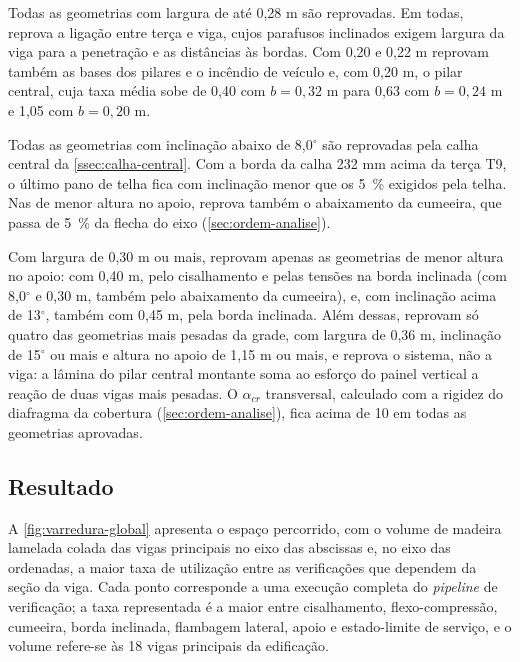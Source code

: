 \begin{alineas}
    \item Todas as geometrias com largura de até 0,28 m são reprovadas. Em todas,
          reprova a ligação entre terça e viga, cujos parafusos inclinados exigem
          largura da viga para a penetração e as distâncias às bordas. Com 0,20 e
          0,22 m reprovam também as bases dos pilares e o incêndio de veículo e,
          com 0,20 m, o pilar central, cuja taxa média sobe de 0,40 com
          $b = 0{,}32$ m para 0,63 com $b = 0{,}24$ m e 1,05 com $b = 0{,}20$ m.
    \item Todas as geometrias com inclinação abaixo de 8,0$^{\circ}$ são reprovadas
          pela calha central da \autoref{ssec:calha-central}. Com a borda da
          calha 232 mm acima da terça T9, o último pano de telha fica com
          inclinação menor que os 5~\% exigidos pela telha. Nas de menor altura
          no apoio, reprova também o abaixamento da cumeeira, que passa de 5~\%
          da flecha do eixo (\autoref{sec:ordem-analise}).
    \item Com largura de 0,30 m ou mais, reprovam apenas as geometrias de menor
          altura no apoio: com 0,40 m, pelo cisalhamento e pelas tensões na
          borda inclinada (com 8,0$^{\circ}$ e 0,30 m, também pelo abaixamento da
          cumeeira), e, com inclinação acima de 13$^{\circ}$, também com
          0,45 m, pela borda inclinada. Além dessas, reprovam só quatro das geometrias mais pesadas da grade,
          com largura de 0,36 m, inclinação de 15$^{\circ}$ ou mais e altura no
          apoio de 1,15 m ou mais, e reprova o sistema, não a viga:
          a lâmina do pilar central montante soma ao esforço do painel vertical a
          reação de duas vigas mais pesadas. O $\alpha_{cr}$ transversal, calculado
          com a rigidez do diafragma da cobertura (\autoref{sec:ordem-analise}),
          fica acima de 10 em todas as geometrias aprovadas.
\end{alineas}

\subsection{Resultado}\label{ssec:resultado-varredura}

A \autoref{fig:varredura-global} apresenta o espaço percorrido, com o volume de
madeira lamelada colada das vigas principais no eixo das abscissas e, no eixo
das ordenadas, a maior taxa de utilização entre as verificações que dependem da
seção da viga. Cada ponto corresponde a uma execução completa do
\textit{pipeline} de verificação; a taxa representada é a maior entre
cisalhamento, flexo-compressão, cumeeira, borda inclinada, flambagem lateral,
apoio e estado-limite de serviço, e o volume refere-se às 18 vigas
principais da edificação.

